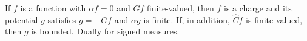 If $f$ is a function with $\alpha f = 0$ and $Gf$ finite-valued, then $f$ is a charge and its potential $g$ satisfies $g = -Gf$ and $\alpha g$ is finite. If, in addition, $\hat{C}f$ is finite-valued, then $g$ is bounded. Dually for signed measures.